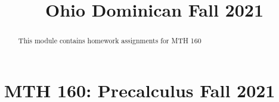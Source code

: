 \documentclass{xourse}
\title{Ohio Dominican Fall 2021}
\begin{document}
  
\begin{abstract} %
This module contains homework assignments for  MTH 160
\end{abstract}  
\maketitle  

\part{MTH 160: Precalculus Fall 2021}
\end{document}
